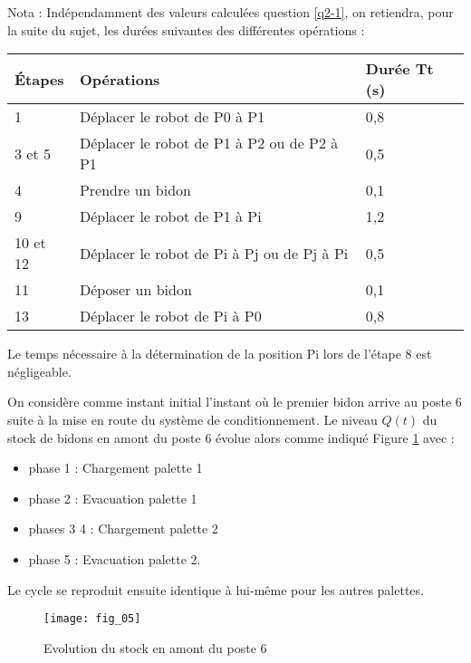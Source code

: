 Nota : Indépendamment des valeurs calculées question \ref{q2-1}, on retiendra, pour la suite 
du sujet, les durées suivantes des différentes opérations :

\begin{center}
\begin{tabular}{lll}
\hline
Étapes	& Opérations 			& Durée Tt (s) 	\\
\hline
1	& Déplacer le robot de P0 à P1 	& 0,8 		\\
3 et 5 	& Déplacer le robot de P1 à P2 ou de P2 à P1 & 0,5 \\ 
4 	& Prendre un bidon 		& 0,1 \\ 
9 	& Déplacer le robot de P1 à Pi 	& 1,2 \\
10 et 12 & Déplacer le robot de Pi à Pj ou de Pj à Pi & 0,5 \\ 
11 	& Déposer un bidon 		& 0,1 \\ 
13 	& Déplacer le robot de Pi à P0 	& 0,8 \\
\hline
\end{tabular}
\end{center}

Le temps nécessaire à la détermination de la position Pi lors de l’étape 8 est négligeable. 


On considère comme instant initial l’instant où le premier bidon arrive au poste 6 suite à la 
mise en route du système de conditionnement. Le niveau $Q(t)$ du stock de bidons en amont du 
poste 6 évolue alors comme indiqué Figure \ref{kuka:fig:05} avec :
\begin{itemize}
\item phase 1 : Chargement palette 1 
\item phase 2 : Evacuation palette 1 
\item phases 3 4 : Chargement palette 2 
\item phase 5 : Evacuation palette 2.
\end{itemize}

Le cycle se reproduit ensuite identique à lui-même pour les autres palettes. 


\begin{figure}[H]
\centering
\texttt{[image: fig\_05]}
\caption{Evolution du stock en amont du poste 6\label{kuka:fig:05}}
\end{figure}


